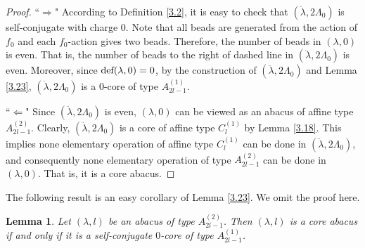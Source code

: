 \documentclass[11pt]{amsart}
\theoremstyle{plain}
\numberwithin{equation}{subsection}
\newtheorem{lemma}[theorem]{Lemma}
\newcommand{\lam}{\lambda}
\begin{document}
\begin{proof}
``$\Longrightarrow$" According to Definition \ref{3.2}, it is easy to check that $(\ddot{\lambda},2\Lambda_0)$ is self-conjugate with charge $0$. 
Note that all beads are generated from the action of $f_0$ and each $f_0$-action gives two beads. Therefore, the number of beads in $(\lambda, 0)$ is even. 
That is, the number of beads to the right of dashed line in $(\ddot{\lambda},2\Lambda_0)$ is even. 
Moreover, since $\rm def(\lambda, 0)=0$, by the construction of $(\ddot{\lambda},2\Lambda_0)$ and
Lemma \ref{3.23}, $(\ddot{\lambda},2\Lambda_0)$ is a $0$-core of type $A_{2l-1}^{(1)}$.

\smallskip
	
``$\Longleftarrow$" Since $(\ddot{\lambda}, 2\Lambda_0)$ is even, $(\lam, 0)$ can be viewed as an abacus of affine type $A_{2l-1}^{(2)}$.
Clearly,  $(\ddot{\lambda}, 2\Lambda_0)$ is a core of affine type $C_l^{(1)}$ by Lemma \ref{3.18}. 
This implies none elementary operation of affine type $C_l^{(1)}$ can be done in $(\ddot{\lambda}, 2\Lambda_0)$, 
and consequently none elementary operation of type $A^{(2)}_{2l-1}$ can be done in $(\lam, 0)$. 
That is, it is a core abacus.
\end{proof}

The following result is an easy corollary of Lemma \ref{3.23}. We omit the proof here.

\begin{lemma}\label{3.24'}
Let $(\lambda, l)$ be an abacus of type $A_{2l-1}^{(2)}$. Then $(\lambda, l)$ is a core abacus if and only if 
it is a self-conjugate $0$-core of type $A_{2l-1}^{(1)}$.
\end{lemma}

\end{document}
